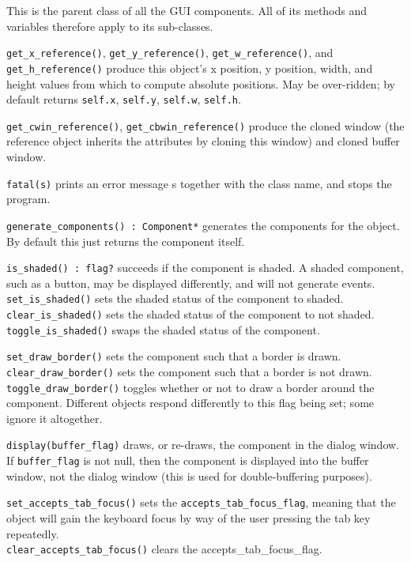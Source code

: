 
This is the parent class of all the GUI components. All of its methods
and variables therefore apply to its sub-classes.

\texttt{get\_x\_reference()}, \texttt{get\_y\_reference()},
\texttt{get\_w\_reference()}, and
\texttt{get\_h\_reference()} produce this
object's x position, y position, width, and height
values from which to compute absolute positions. May be over-ridden;
by default returns \texttt{self.x}, \texttt{self.y}, \texttt{self.w},
\texttt{self.h}.

\texttt{get\_cwin\_reference()}, \texttt{get\_cbwin\_reference()} produce
the cloned window (the reference object inherits the attributes by
cloning this window) and cloned buffer window.

\texttt{fatal(s)} prints an error message s together with the class name, and
stops the program.

\texttt{generate\_components() : Component*} generates the components for the
object. By default this just returns the component itself.

\texttt{is\_shaded() : flag?} succeeds if the component is shaded. A shaded
component, such as a button, may be displayed differently, and will not
generate events.\\
\texttt{set\_is\_shaded()} sets the shaded status of the component to
shaded.\\
\texttt{clear\_is\_shaded()} sets the shaded status of the component to not
shaded.\\
\texttt{toggle\_is\_shaded()} swaps the shaded status of the component.

\texttt{set\_draw\_border()} sets the component such that a border is
drawn.\\
\texttt{clear\_draw\_border()} sets the component such that a border is not
drawn.\\
\texttt{toggle\_draw\_border()} toggles whether or not to draw a border around
the component. Different objects respond differently to this flag being
set; some ignore it altogether.

\texttt{display(buffer\_flag)} draws, or re-draws, the component in the dialog
window. If \texttt{buffer\_flag} is not null, then the component is displayed
into the buffer window, not the dialog window (this is used for
double-buffering purposes).

\texttt{set\_accepts\_tab\_focus()} sets the
\texttt{accepts\_tab\_focus\_flag}, meaning
that the object will gain the keyboard focus by way of the user
pressing the tab key repeatedly.\\
\texttt{clear\_accepts\_tab\_focus()} clears the accepts\_tab\_focus\_flag.

